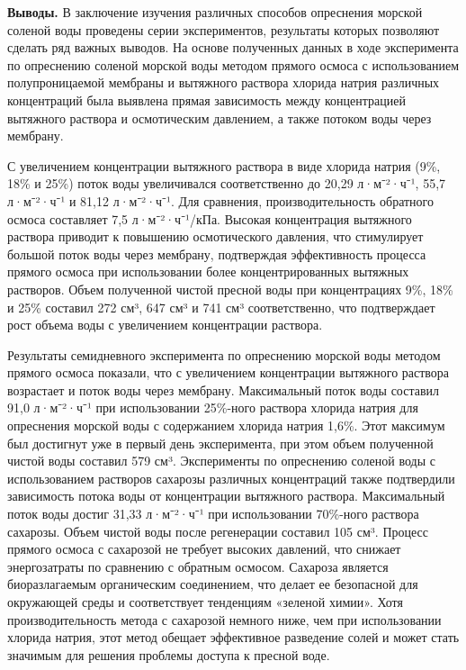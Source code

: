 {\bfseries Выводы.} В заключение изучения различных способов опреснения
морской соленой воды проведены серии экспериментов, результаты которых
позволяют сделать ряд важных выводов. На основе полученных данных в ходе
эксперимента по опреснению соленой морской воды методом прямого осмоса с
использованием полупроницаемой мембраны и вытяжного раствора хлорида
натрия различных концентраций была выявлена прямая зависимость между
концентрацией вытяжного раствора и осмотическим давлением, а также
потоком воды через мембрану.

С увеличением концентрации вытяжного раствора в виде хлорида натрия
(9\%, 18\% и 25\%) поток воды увеличивался соответственно до 20,29
л·м⁻²·ч⁻¹, 55,7 л·м⁻²·ч⁻¹ и 81,12 л·м⁻²·ч⁻¹. Для сравнения,
производительность обратного осмоса составляет 7,5 л·м⁻²·ч⁻¹/кПа.
Высокая концентрация вытяжного раствора приводит к повышению
осмотического давления, что стимулирует большой поток воды через
мембрану, подтверждая эффективность процесса прямого осмоса при
использовании более концентрированных вытяжных растворов. Объем
полученной чистой пресной воды при концентрациях 9\%, 18\% и 25\%
составил 272 см³, 647 см³ и 741 см³ соответственно, что подтверждает
рост объема воды с увеличением концентрации раствора.

Результаты семидневного эксперимента по опреснению морской воды методом
прямого осмоса показали, что с увеличением концентрации вытяжного
раствора возрастает и поток воды через мембрану. Максимальный поток воды
составил 91,0 л·м⁻²·ч⁻¹ при использовании 25\%-ного раствора хлорида
натрия для опреснения морской воды с содержанием хлорида натрия 1,6\%.
Этот максимум был достигнут уже в первый день эксперимента, при этом
объем полученной чистой воды составил 579 см³. Эксперименты по
опреснению соленой воды с использованием растворов сахарозы различных
концентраций также подтвердили зависимость потока воды от концентрации
вытяжного раствора. Максимальный поток воды достиг 31,33 л·м⁻²·ч⁻¹ при
использовании 70\%-ного раствора сахарозы. Объем чистой воды после
регенерации составил 105 см³. Процесс прямого осмоса с сахарозой не
требует высоких давлений, что снижает энергозатраты по сравнению с
обратным осмосом. Сахароза является биоразлагаемым органическим
соединением, что делает ее безопасной для окружающей среды и
соответствует тенденциям «зеленой химии». Хотя производительность метода
с сахарозой немного ниже, чем при использовании хлорида натрия, этот
метод обещает эффективное разведение солей и может стать значимым для
решения проблемы доступа к пресной воде.

